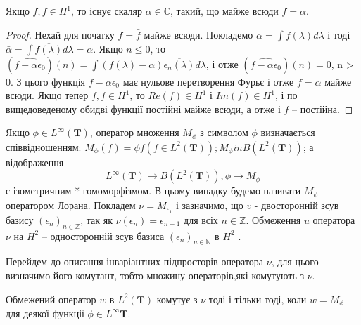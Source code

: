 \begin{lemma}
    Якщо $f, \bar{f} \in H^1$, то існує скаляр $\alpha \in \mathbb{C}$, такий, що майже всюди $f = \alpha$.
    \begin{proof}
        Нехай для початку $f = \bar{f}$ майже всюди.
        Покладемо $\alpha = \int f(\lambda) d\lambda$ і тоді $\bar{\alpha} = \int \overline{f(\lambda)} d \lambda = \alpha$.
        Якщо $n \leq 0$, то $(\widehat{f - \alpha \epsilon_0})(n) = \int (f(\lambda) - \alpha)\overline{\epsilon_n(\lambda)} d \lambda$,
        і отже $(\widehat{f - \alpha \epsilon_0})(n) = 0$, n > 0.
        З цього функція $f - \alpha \epsilon_0$ має нульове перетворення Фурьє і
        отже $f = \alpha$ майже всюди.
        Якщо тепер $f, \bar{f} \in H^1$, то $Re(f) \in H^1$ і $Im(f) \in H^1$, і по вищедоведеному
        обидві функції постійні майже всюди, а отже і $f$ – постійна.
    \end{proof}
\end{lemma}

Якщо $\phi \in L^\infty(\textbf{T})$, оператор множення $M_\phi$ з символом $\phi$ визначається \\ співвідношенням:
$M_\phi(f) = \phi f (f \in L^2(\textbf{T})); M_\phi in B(L^2(\textbf{T}))$; а відображення
\begin{equation*}
    L^\infty(\textbf{T}) \to B(L^2(\textbf{T})), \phi \to M_\phi
\end{equation*}
є ізометричним *-гомоморфізмом.
В цьому випадку будемо називати $M_\phi$ \\ оператором Лорана.
Покладем $\nu = M_{\epsilon_1}$ і зазначимо, що $v$ - двосторонній зсув базису
$(\epsilon_n)_{n \in \mathbb{Z}}$, так як $\nu(\epsilon_n) = \epsilon_{n+1}$ для
всіх $n \in \mathbb{Z}$.
Обмеження $u$ оператора $\nu$ на $H^2$  -- односторонній зсув базиса $(\epsilon_n)_{n \in \mathbb{N}}$ в $H^2$ .

Перейдем до описання інваріантних підпросторів оператора $\nu$, для цього визначимо його
комутант, тобто множину операторів,які комутують з $\nu$.

\begin{theorem}
    \label{теорема:комутуючі зі зсувом оператори}
    Обмежений оператор $w$ в $ L^2(\textbf{T}) $ комутує з $\nu$ тоді і тільки тоді, коли
    $w = M_\phi$ для деякої функції $\phi \in L^\infty{\textbf{T}}$.
\end{theorem}

